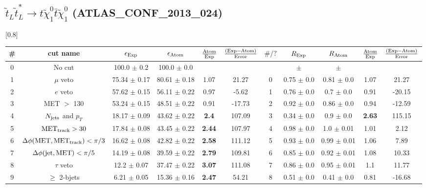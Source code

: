 \documentclass[12pt]{article}
\begin{document}
    
\subsection*{$\tilde t_L \tilde t_L^* \to t \tilde \chi_1^0 \bar t \tilde \chi_1^0$ (ATLAS\_CONF\_2013\_024)} 


\renewcommand{\arraystretch}{1.3}
\begin{table}[h!]
\begin{center}
\scalebox{0.7}[0.8]{ 
\begin{tabular}{c|c||c|c|>{\columncolor{yellow}}c|c||c|c|c|>{\columncolor{yellow}}c|c}
\hline
\# & cut name & $\epsilon_{\rm Exp}$ & $\epsilon_{\rm Atom}$ & $\frac{\rm Atom}{\rm Exp}$ & $\frac{({\rm Exp} - {\rm Atom})}{\rm Error}$ & $\#/?$ & $R_{\rm Exp}$ & $R_{\rm Atom}$ & $\frac{\rm Atom}{\rm Exp}$ & $\frac{({\rm Exp} - {\rm Atom})}{\rm Error}$ \\
\hline
0 & No cut & 100.0 $\pm$ 0.2 & 100.0 $\pm$ 0.0 &  &  &  &  $\pm$  &  $\pm$  &  &  \\
1 & $\mu$ veto & 75.34 $\pm$ 0.17 & 80.61 $\pm$ 0.18 & 1.07 & 21.27 & 0 & 0.75 $\pm$ 0.0 & 0.81 $\pm$ 0.0 & 1.07 & 21.27 \\
2 & $e$ veto & 57.62 $\pm$ 0.15 & 56.11 $\pm$ 0.22 & 0.97 & -5.62 & 1 & 0.76 $\pm$ 0.0 & 0.7 $\pm$ 0.0 & 0.91 & -20.15 \\
3 & MET $>$ 130 & 53.24 $\pm$ 0.15 & 48.51 $\pm$ 0.22 & 0.91 & -17.73 & 2 & 0.92 $\pm$ 0.0 & 0.86 $\pm$ 0.0 & 0.94 & -12.59 \\
4 & \cellcolor{magenta} $N_{\rm jets}$ and $p_T$ & 18.17 $\pm$ 0.09 & 43.62 $\pm$ 0.22 & \color{red}\bf 2.4 & 107.09 & 3 & 0.34 $\pm$ 0.0 & 0.9 $\pm$ 0.0 & \color{red}\bf 2.63 & 115.15 \\
5 & $\rm MET_{track} > 30$ & 17.84 $\pm$ 0.08 & 43.45 $\pm$ 0.22 & \color{red}\bf 2.44 & 107.97 & 4 & 0.98 $\pm$ 0.0 & 1.0 $\pm$ 0.01 & 1.01 & 2.12 \\
6 & $\Delta \phi (\rm MET, MET_{track}) < \pi/3$ & 16.62 $\pm$ 0.08 & 42.82 $\pm$ 0.22 & \color{red}\bf 2.58 & 111.12 & 5 & 0.93 $\pm$ 0.0 & 0.99 $\pm$ 0.01 & 1.06 & 7.89 \\
7 & $\Delta \phi (\rm jet, MET) < \pi/5$ & 14.19 $\pm$ 0.08 & 39.59 $\pm$ 0.22 & \color{red}\bf 2.79 & 109.81 & 6 & 0.85 $\pm$ 0.0 & 0.92 $\pm$ 0.01 & 1.08 & 10.33 \\
8 & $\tau$ veto & 12.2 $\pm$ 0.07 & 37.47 $\pm$ 0.22 & \color{red}\bf 3.07 & 111.08 & 7 & 0.86 $\pm$ 0.0 & 0.95 $\pm$ 0.01 & 1.1 & 11.77 \\
9 & $\ge$ 2-bjets & 6.21 $\pm$ 0.05 & 15.36 $\pm$ 0.16 & \color{red}\bf 2.47 & 54.21 & 8 & 0.51 $\pm$ 0.0 & 0.41 $\pm$ 0.0 & 0.81 & -16.68 \\

\end{tabular}}
\end{center}
\end{table}
\end{document}
